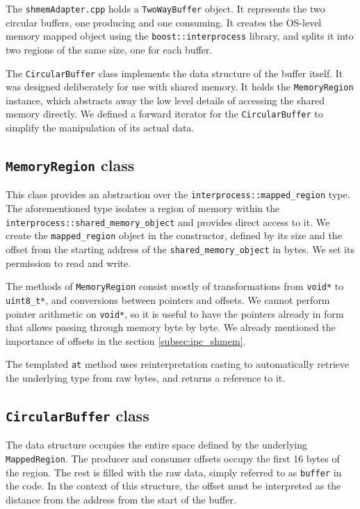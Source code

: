 The \texttt{shmemAdapter.cpp} holds a \texttt{TwoWayBuffer} object. It represents the two circular buffers, one producing and one consuming. It creates the OS-level memory mapped object using the \texttt{boost::interprocess} library, and splits it into two regions of the same size, one for each buffer. 

The \texttt{CircularBuffer} class implements the data structure of the buffer itself. It was designed deliberately for use with shared memory. It holds the \texttt{MemoryRegion} instance, which abstracts away the low level details of accessing the shared memory directly. We defined a forward iterator for the \texttt{CircularBuffer} to simplify the manipulation of its actual data.

\subsection{\texttt{MemoryRegion} class}

This class provides an abstraction over the \texttt{interprocess::mapped\_region} type. The aforementioned type isolates a region of memory within the \texttt{interprocess::shared\_memory\_object} and provides direct access to it. We create the \texttt{mapped\_region} object in the constructor, defined by its size and the offset from the starting address of the \texttt{shared\_memory\_object} in bytes. We set its permission to read and write.

The methods of \texttt{MemoryRegion} consist mostly of transformations from \texttt{void*} to \texttt{uint8\_t*}, and conversions between pointers and offsets. We cannot perform pointer arithmetic on \texttt{void*}, so it is useful to have the pointers already in form that allows passing through memory byte by byte. We already mentioned the importance of offsets in the section \ref{subsec:ipc_shmem}.

The templated \texttt{at} method uses reinterpretation casting to automatically retrieve the underlying type from raw bytes, and returns a reference to it.

\subsection{\texttt{CircularBuffer} class} \label{subsec:b_circular_buffer}

The data structure occupies the entire space defined by the underlying \texttt{MappedRegion}. The producer and consumer offsets occupy the first 16 bytes of the region. The rest is filled with the raw data, simply referred to as \texttt{buffer} in the code. In the context of this structure, the offset must be interpreted as the distance from the address from the start of the buffer.

